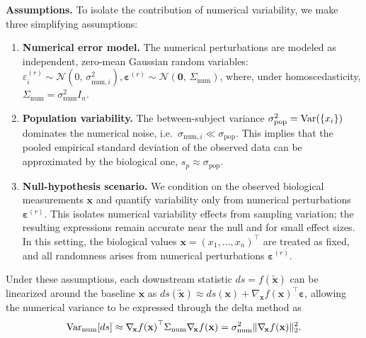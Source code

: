 \vspace{0.4em}
\noindent\textbf{Assumptions.} To isolate the contribution of numerical
variability, we make three simplifying assumptions:
\begin{enumerate}

    \item \textbf{Numerical error model.} The numerical perturbations are
          modeled as independent, zero-mean Gaussian random variables:
          $\varepsilon_i^{(r)} \sim \mathcal{N}(0,\,\sigma_{\mathrm{num},i}^2),
              \boldsymbol{\varepsilon}^{(r)} \sim
              \mathcal{N}\!\left(\mathbf{0},\,\Sigma_{\mathrm{num}}\right)$, where,
          under homoscedasticity, $\Sigma_{\mathrm{num}} =
              \sigma_{\mathrm{num}}^2 I_n$.

    \item \textbf{Population variability.} The between-subject variance
          $\sigma_{\mathrm{pop}}^2 = \mathrm{Var}(\{x_i\})$ dominates the numerical
          noise, i.e.\ $\sigma_{\mathrm{num},i} \ll \sigma_{\mathrm{pop}}$. This
          implies that the pooled empirical standard deviation of the observed
          data can be approximated by the biological one, $s_p \approx
              \sigma_{\mathrm{pop}}$.

    \item \textbf{Null-hypothesis scenario.} We condition on the observed
          biological measurements $\mathbf{x}$ and quantify variability only
          from numerical perturbations $\boldsymbol{\varepsilon}^{(r)}$. This
          isolates numerical variability effects from sampling variation; the
          resulting expressions remain accurate near the null and for small
          effect sizes. In this setting, the biological values $\mathbf{x} =
              {(x_1, \dots, x_n)}^\top$ are treated as fixed, and all randomness
          arises from numerical perturbations $\boldsymbol{\varepsilon}^{(r)}$.

\end{enumerate}

Under these assumptions, each downstream statistic $ds = f(\tilde{\mathbf{x}})$
can be linearized around the baseline $\mathbf{x}$ as $ds(\tilde{\mathbf{x}})
    \approx ds(\mathbf{x}) + \nabla_{\!\mathbf{x}}f{(\mathbf{x})}^\top
    \boldsymbol{\varepsilon}$, allowing the numerical variance to be expressed
through the delta method as
\begin{equation}
    \mathrm{Var}_{\mathrm{num}}[ds]
    \approx
    \nabla_{\!\mathbf{x}} f{(\mathbf{x})}^\top
    \Sigma_{\mathrm{num}}
    \nabla_{\!\mathbf{x}} f{(\mathbf{x})}
    = \sigma_{\mathrm{num}}^2 \|\nabla_{\!\mathbf{x}} f{(\mathbf{x})}\|_2^2.
    \label{eq:var-ds}
\end{equation}

